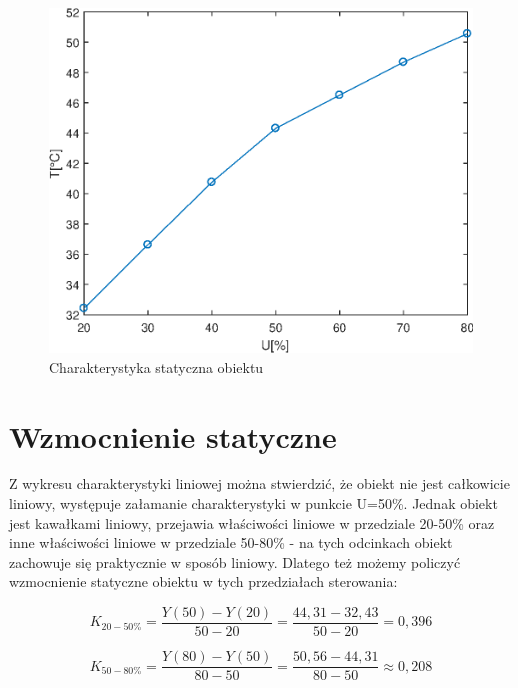 \begin{figure}[h!]
	\centering
	\includegraphics[scale=1]{Rys/Char_stat.eps}
	\caption{Charakterystyka statyczna obiektu}
	\label{stat}
\end{figure}


\section{Wzmocnienie statyczne}

Z wykresu charakterystyki liniowej można stwierdzić, że obiekt nie jest całkowicie liniowy, występuje załamanie charakterystyki w punkcie U=\num{50}\%. Jednak obiekt jest kawałkami liniowy, przejawia właściwości liniowe w przedziale \num{20}-\num{50}\% oraz inne  właściwości liniowe w przedziale \num{50}-\num{80}\% - na tych odcinkach obiekt zachowuje się praktycznie w sposób liniowy. Dlatego też możemy policzyć wzmocnienie statyczne obiektu w tych przedziałach sterowania:

\begin{equation}
K_{\num{20}-\num{50}\%}= \frac{Y(50)-Y(20)}{50-20}=\frac{44,31-32,43}{50-20}=0,396
\label{zad2_wzm_statyczne_wzor1}
\end{equation}


\begin{equation}
K_{\num{50}-\num{80}\%}= \frac{Y(80)-Y(50)}{80-50}=\frac{50,56-44,31}{80-50}\approx 0,208
\label{zad2_wzm_statyczne_wzor2}
\end{equation}


